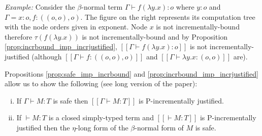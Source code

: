 \documentclass{llncs}
\newcommand{\sem}[1]{{[\![ #1 ]\!]}}
\newcommand{\tree}[2][levelsep=3.5ex]{\pstree[levelsep=3.5ex,#1]{\TR{#2}}}
\begin{document}


\parpic[r]{
${\tree{\lambda^3}{\tree{f^2}{ \tree{\lambda y^1}{ \TR{x^0} }}}}$
}
\noindent \emph{Example:} %
Consider the $\beta$-normal term $\Gamma \vdash f (\lambda y .x) : o$ where $y:o$ and $\Gamma = x:o, f:((o,o),o)$. The figure on the right represents its computation tree
with the node orders given in exponent.  Node $x$ is not
incrementally-bound therefore $\tau(f (\lambda y .x))$ is not
incrementally-bound and by Proposition
\ref{prop:incrbound_imp_incrjustified}, $\sem{\Gamma \vdash f (\lambda y .x) : o}$ is
not incrementally-justified (although $\sem{\Gamma \vdash f : ((o,o),o)}$ and $\sem{\Gamma \vdash \lambda
  y. x : (o,o)}$ are).

Propositions \ref{prop:safe_imp_incrbound} and
\ref{prop:incrbound_imp_incrjustified} allow us to show the following (see long version of the paper):

\begin{theorem}
\label{thm:safeincrejust}
\begin{enumerate}[(i)]
\item If $\Gamma \vdash M : T$ is safe then $\sem{\Gamma \vdash M : T}$ is P-incrementally justified.
\item If $\vdash M : T$ is a closed simply-typed term and $\sem{\vdash M : T}$ is P-incrementally justified then the $\eta$-long form of the $\beta$-normal form of $M$ is safe.
\end{enumerate}
\end{theorem}
\end{document}
